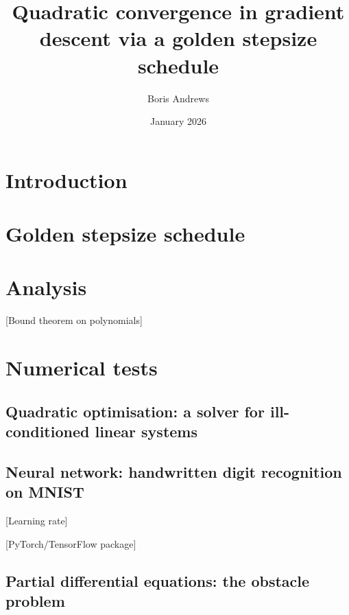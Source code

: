 \documentclass{article}
\title{Quadratic convergence in gradient descent via a golden stepsize schedule}
\author{Boris Andrews}
\date{January 2026}
\begin{document}
\maketitle

\section{Introduction}

\section{Golden stepsize schedule}

\section{Analysis}

[Bound theorem on polynomials]

\section{Numerical tests}

\subsection{Quadratic optimisation: a solver for ill-conditioned linear systems}

\subsection{Neural network: handwritten digit recognition on MNIST}

[Learning rate]

[PyTorch/TensorFlow package]

\subsection{Partial differential equations: the obstacle problem}
\end{document}
